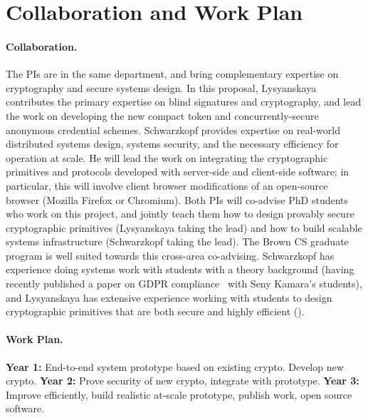 \section{Collaboration and Work Plan}

\paragraph{Collaboration.}
%
The PIs are in the same department, and bring complementary expertise on cryptography and secure systems design.
%
In this proposal, Lysyanskaya contributes the primary expertise on blind signatures and cryptography, and lead the work on developing the new compact token and concurrently-secure anonymous credential schemes.
%
Schwarzkopf provides expertise on real-world distributed systems design, systems security, and the necessary efficiency for operation at scale.
%
He will lead the work on integrating the cryptographic primitives and protocols developed with server-side and client-side software; in particular, this will involve client browser modifications of an open-source browser (Mozilla Firefox or Chromium).
%
Both PIs will co-advise PhD students who work on this project, and jointly teach them how to design provably secure cryptographic primitives (Lysyanskaya taking the lead) and how to build scalable systems infrastructure (Schwarzkopf taking the lead).
%
The Brown CS graduate program is well suited towards this cross-area co-advising.
%
Schwarzkopf has experience doing systems work with students with a theory background (\eg having recently published a paper on GDPR compliance~\cite{gdprizer} with Seny Kamara's students), and Lysyanskaya has extensive experience working with students to design cryptographic primitives that are both secure and highly efficient ().
%

\paragraph{Work Plan.}
%
\textbf{Year 1:} End-to-end system prototype based on existing crypto. Develop new crypto.
%
\textbf{Year 2:} Prove security of new crypto, integrate with prototype.
%
\textbf{Year 3:} Improve efficiently, build realistic at-scale prototype, publish work, open source software.
%
